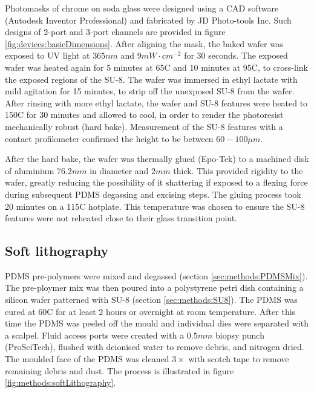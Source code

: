         Photomasks of chrome on soda glass were designed using a CAD software (Autodesk Inventor Professional) and fabricated by JD Photo-tools Inc. Such designs of 2-port and 3-port channels are provided in figure \ref{fig:devices:basicDimensions}. After aligning the mask, the baked wafer was exposed to UV light at \(365nm\) and \(9mW\cdot cm^{-2}\) for 30 seconds. The exposed wafer was heated again for 5 minutes at 65\degree C and 10 minutes at 95\degree C, to cross-link the exposed regions of the SU-8. The wafer was immersed in ethyl lactate with mild agitation for 15 minutes, to strip off the unexposed SU-8 from the wafer. After rinsing with more ethyl lactate, the wafer and SU-8 features were heated to 150\degree C for 30 minutes and allowed to cool, in order to render the photoresist mechanically robust (hard bake). Measurement of the SU-8 features with a contact profilometer confirmed the height to be between \(60-100\mu m\).

        After the hard bake, the wafer was thermally glued (Epo-Tek) to a machined disk of aluminium \(76.2mm\) in diameter and \(2mm\) thick. This provided rigidity to the wafer, greatly reducing the possibility of it shattering if exposed to a flexing force during subsequent PDMS degassing and excising steps.
        The gluing process took 20 minutes on a 115\degree C hotplate. This temperature was chosen to ensure the SU-8 features were not reheated close to their glass transition point.
        \label{sec:methods:SU8}

        \subsection{Soft lithography}
        PDMS pre-polymers were mixed and degassed (section \ref{sec:methods:PDMSMix}). The pre-ploymer mix was then poured into a polystyrene petri dish containing a silicon wafer patterned with SU-8 (section \ref{sec:methods:SU8}).
        The PDMS was cured at 60\degree C for at least 2 hours or overnight at room temperature. After this time the PDMS was peeled off the mould and individual dies were separated with a scalpel. Fluid access ports were created with a \(0.5mm\) biopsy punch (ProSciTech), flushed with deionised water to remove debris, and nitrogen dried. The moulded face of the PDMS was cleaned \(3\times\) with scotch tape to remove remaining debris and dust. The process is illustrated in figure \ref{fig:methods:softLithography}.

